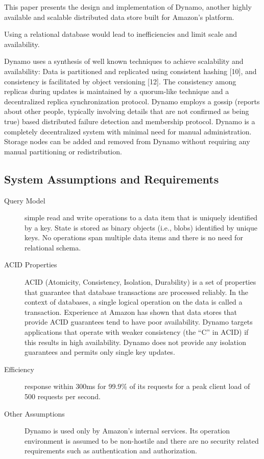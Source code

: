 
This paper presents the design and implementation of Dynamo, another highly available and scalable distributed data store built for Amazon’s platform. 

Using a relational database would lead to inefficiencies and limit scale and availability.

Dynamo uses a synthesis of well known techniques to achieve
scalability and availability: Data is partitioned and replicated
using consistent hashing [10], and consistency is facilitated by
object versioning [12]. The consistency among replicas during
updates is maintained by a quorum-like technique and a
decentralized replica synchronization protocol. 
Dynamo employs a gossip (reports about other people, typically involving details that are not confirmed as being true) based distributed failure detection and membership protocol. Dynamo is a completely decentralized system with
minimal need for manual administration. Storage nodes can be
added and removed from Dynamo without requiring any manual
partitioning or redistribution. 

\subsection{System Assumptions and Requirements}

\begin{description}
\item[Query Model] simple read and write operations to a data item that
is uniquely identified by a key. State is stored as binary objects
(i.e., blobs) identified by unique keys. No operations span
multiple data items and there is no need for relational schema. 

\item[ACID Properties] ACID (Atomicity, Consistency, Isolation,
Durability) is a set of properties that guarantee that database
transactions are processed reliably. In the context of databases, a
single logical operation on the data is called a transaction.
Experience at Amazon has shown that data stores that provide
ACID guarantees tend to have poor availability. Dynamo targets applications that operate with weaker consistency
(the “C” in ACID) if this results in high availability. Dynamo
does not provide any isolation guarantees and permits only single
key updates. 

\item[Efficiency] response within 300ms for 99.9\% of its requests for a
peak client load of 500 requests per second.

\item[Other Assumptions] Dynamo is used only by Amazon’s internal
services. Its operation environment is assumed to be non-hostile
and there are no security related requirements such as
authentication and authorization.
\end{description}

